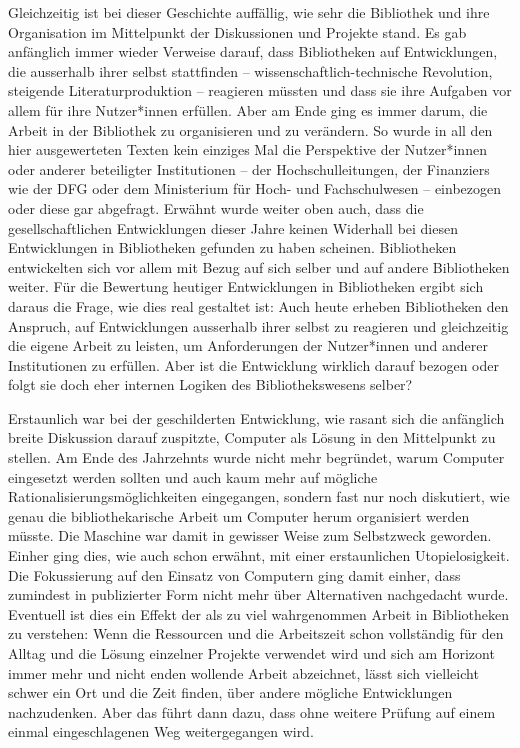 \documentclass[a4paper,
fontsize=11pt,
oneside,
numbers=noperiodatend,
parskip=half-,
bibliography=totoc,
final
]{scrartcl}
\begin{document}
Gleichzeitig ist bei dieser Geschichte auffällig, wie sehr die
Bibliothek und ihre Organisation im Mittelpunkt der Diskussionen und
Projekte stand. Es gab anfänglich immer wieder Verweise darauf, dass
Bibliotheken auf Entwicklungen, die ausserhalb ihrer selbst stattfinden
-- wissenschaftlich-technische Revolution, steigende Literaturproduktion
-- reagieren müssten und dass sie ihre Aufgaben vor allem für ihre
Nutzer*innen erfüllen. Aber am Ende ging es immer darum, die Arbeit in
der Bibliothek zu organisieren und zu verändern. So wurde in all den
hier ausgewerteten Texten kein einziges Mal die Perspektive der
Nutzer*innen oder anderer beteiligter Institutionen -- der
Hochschulleitungen, der Finanziers wie der DFG oder dem Ministerium für
Hoch- und Fachschulwesen -- einbezogen oder diese gar abgefragt. Erwähnt
wurde weiter oben auch, dass die gesellschaftlichen Entwicklungen dieser
Jahre keinen Widerhall bei diesen Entwicklungen in Bibliotheken gefunden
zu haben scheinen. Bibliotheken entwickelten sich vor allem mit Bezug
auf sich selber und auf andere Bibliotheken weiter. Für die Bewertung
heutiger Entwicklungen in Bibliotheken ergibt sich daraus die Frage, wie
dies real gestaltet ist: Auch heute erheben Bibliotheken den Anspruch,
auf Entwicklungen ausserhalb ihrer selbst zu reagieren und gleichzeitig
die eigene Arbeit zu leisten, um Anforderungen der Nutzer*innen und
anderer Institutionen zu erfüllen. Aber ist die Entwicklung wirklich
darauf bezogen oder folgt sie doch eher internen Logiken des
Bibliothekswesens selber?

Erstaunlich war bei der geschilderten Entwicklung, wie rasant sich die
anfänglich breite Diskussion darauf zuspitzte, Computer als Lösung in
den Mittelpunkt zu stellen. Am Ende des Jahrzehnts wurde nicht mehr
begründet, warum Computer eingesetzt werden sollten und auch kaum mehr
auf mögliche Rationalisierungsmöglichkeiten eingegangen, sondern fast
nur noch diskutiert, wie genau die bibliothekarische Arbeit um Computer
herum organisiert werden müsste. Die Maschine war damit in gewisser
Weise zum Selbstzweck geworden. Einher ging dies, wie auch schon
erwähnt, mit einer erstaunlichen Utopielosigkeit. Die Fokussierung auf
den Einsatz von Computern ging damit einher, dass zumindest in
publizierter Form nicht mehr über Alternativen nachgedacht wurde.
Eventuell ist dies ein Effekt der als zu viel wahrgenommen Arbeit in
Bibliotheken zu verstehen: Wenn die Ressourcen und die Arbeitszeit schon
vollständig für den Alltag und die Lösung einzelner Projekte verwendet
wird und sich am Horizont immer mehr und nicht enden wollende Arbeit
abzeichnet, lässt sich vielleicht schwer ein Ort und die Zeit finden,
über andere mögliche Entwicklungen nachzudenken. Aber das führt dann
dazu, dass ohne weitere Prüfung auf einem einmal eingeschlagenen Weg
weitergegangen wird.
\end{document}
